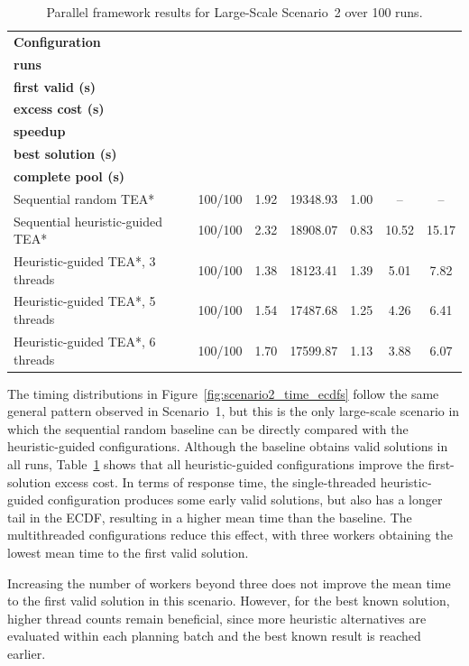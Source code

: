\begin{table}[H]
\centering
\caption{Parallel framework results for Large-Scale Scenario~2 over 100 runs.}
\label{tab:parallel_results_scene2}
\scriptsize
\setlength{\tabcolsep}{3.5pt}
\begin{tabular}{@{}lcccccc@{}}
\toprule
\textbf{Configuration} &
\makecell{\textbf{Valid}\\\textbf{runs}} &
\makecell{\textbf{Mean time to}\\\textbf{first valid (s)}} &
\makecell{\textbf{Mean first}\\\textbf{excess cost (s)}} &
\makecell{\textbf{Solution-time}\\\textbf{speedup}} &
\makecell{\textbf{Mean time to}\\\textbf{best solution (s)}} &
\makecell{\textbf{Mean time to}\\\textbf{complete pool (s)}} \\
\midrule
Sequential random TEA*          & 100/100 & 1.92 & 19348.93 & 1.00 & --    & --    \\
Sequential heuristic-guided TEA*  & 100/100 & 2.32 & 18908.07 & 0.83 & 10.52 & 15.17 \\
Heuristic-guided TEA*, 3 threads & 100/100 & 1.38 & 18123.41 & 1.39 & 5.01  & 7.82  \\
Heuristic-guided TEA*, 5 threads & 100/100 & 1.54 & 17487.68 & 1.25 & 4.26  & 6.41  \\
Heuristic-guided TEA*, 6 threads & 100/100 & 1.70 & 17599.87 & 1.13 & 3.88  & 6.07  \\
\bottomrule
\end{tabular}
\end{table}

The timing distributions in Figure~\ref{fig:scenario2_time_ecdfs} follow the same general pattern
observed in Scenario~1, but this is the only large-scale scenario in which the sequential random
baseline can be directly compared with the heuristic-guided configurations. Although the baseline
obtains valid solutions in all runs, Table~\ref{tab:parallel_results_scene2} shows that all
heuristic-guided configurations improve the first-solution excess cost. In terms of response time, the
single-threaded heuristic-guided configuration produces some early valid solutions, but also has a
longer tail in the ECDF, resulting in a higher mean time than the baseline. The multithreaded
configurations reduce this effect, with three workers obtaining the lowest mean time to the first
valid solution.

Increasing the number of workers beyond three does not improve the mean time to the first valid
solution in this scenario. However, for the best known solution, higher thread counts remain
beneficial, since more heuristic alternatives are evaluated within each planning batch and the
best known result is reached earlier.

